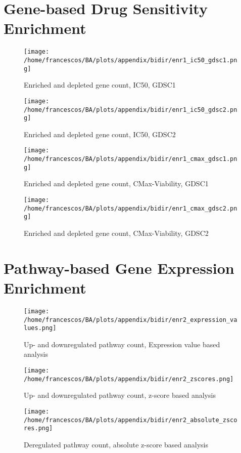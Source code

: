 \section{Gene-based Drug Sensitivity Enrichment}

\begin{figure}[H]
    \begin{minipage}[t]{0.5\textwidth}
        \centering
        \texttt{[image: /home/francescos/BA/plots/appendix/bidir/enr1\_ic50\_gdsc1.png]}
        \caption{Enriched and depleted gene count, IC50, GDSC1}
    \end{minipage}
    \hfill
    \begin{minipage}[t]{0.5\textwidth}
        \centering
        \texttt{[image: /home/francescos/BA/plots/appendix/bidir/enr1\_ic50\_gdsc2.png]}
        \caption{Enriched and depleted gene count, IC50, GDSC2}
    \end{minipage}
\end{figure}

\begin{figure}[H]
    \begin{minipage}[t]{0.5\textwidth}
        \centering
        \texttt{[image: /home/francescos/BA/plots/appendix/bidir/enr1\_cmax\_gdsc1.png]}
        \caption{Enriched and depleted gene count, CMax-Viability, GDSC1}
    \end{minipage}
    \hfill
    \begin{minipage}[t]{0.5\textwidth}
        \centering
        \texttt{[image: /home/francescos/BA/plots/appendix/bidir/enr1\_cmax\_gdsc2.png]}
        \caption{Enriched and depleted gene count, CMax-Viability, GDSC2}
    \end{minipage}
\end{figure}

\section{Pathway-based Gene Expression Enrichment}

\begin{figure}[H]
    \centering
    \texttt{[image: /home/francescos/BA/plots/appendix/bidir/enr2\_expression\_values.png]}
    \caption{Up- and downregulated pathway count, Expression value based analysis}
\end{figure}
\begin{figure}[H]
    \centering
    \texttt{[image: /home/francescos/BA/plots/appendix/bidir/enr2\_zscores.png]}
    \caption{Up- and downregulated pathway count, z-score based analysis}
\end{figure}
\begin{figure}[H]
    \centering
    \texttt{[image: /home/francescos/BA/plots/appendix/bidir/enr2\_absolute\_zscores.png]}
    \caption{Deregulated pathway count, absolute z-score based analysis}
\end{figure}

